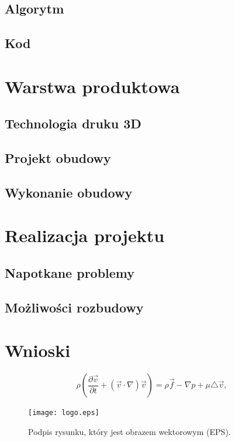 \documentclass[a4paper,12pt,reqno]{article}
\begin{document}
\subsection{Algorytm}
\subsection{Kod}

\newpage
\section{Warstwa produktowa}
\subsection{Technologia druku 3D}
\subsection{Projekt obudowy}
\subsection{Wykonanie obudowy}

\newpage
\section{Realizacja projektu}
\subsection{Napotkane problemy}
\subsection{Możliwości rozbudowy}

\newpage
\section{Wnioski}

\newpage





\newpage

\begin{equation} 
\rho\left(\frac{\partial\vec v}{\partial t}+(\vec v\cdot\nabla)\vec v\right) =\rho\vec f - \nabla p + \mu\triangle\vec v, \label{rownanie}
\end{equation} 

\begin{figure}[!ht]%
\centering
\texttt{[image: logo.eps]}
\caption{Podpis rysunku, który jest obrazem wektorowym (EPS). \label{logotyp}}
\qquad
\end{figure}   
\end{document}
